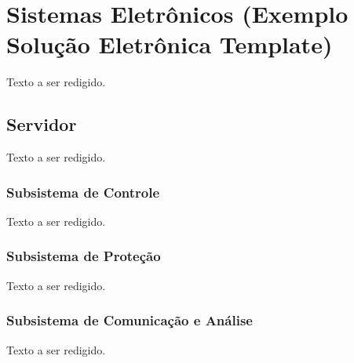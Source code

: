 \section{Sistemas Eletrônicos (Exemplo Solução Eletrônica Template)}
Texto a ser redigido.

\subsection{Servidor}

Texto a ser redigido.

\subsubsection{Subsistema de Controle}

Texto a ser redigido.

\subsubsection{Subsistema de Proteção}

Texto a ser redigido.

\subsubsection{Subsistema de Comunicação e Análise}

Texto a ser redigido.
